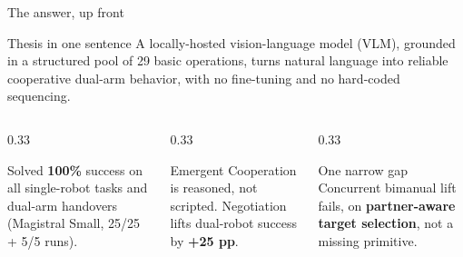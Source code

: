 \documentclass[aspectratio=169,11pt]{beamer}
\begin{document}
\begin{frame}{The answer, up front}
	\begin{block}{Thesis in one sentence}
		A \alert{locally-hosted vision-language model (VLM)}, grounded in a structured pool
		of \alert{29 basic operations}, turns natural language into reliable
		\alert{cooperative dual-arm behavior}, with \alert{no fine-tuning and no
			hard-coded sequencing}.
	\end{block}
	\vfill
	\begin{columns}[t]
		\begin{column}{0.33\textwidth}
			\begin{exampleblock}{Solved}
				\textbf{100\%} success on all single-robot tasks and dual-arm handovers
				(Magistral Small, 25/25 + 5/5 runs).
			\end{exampleblock}
		\end{column}
		\begin{column}{0.33\textwidth}
			\begin{exampleblock}{Emergent}
				Cooperation is reasoned, not scripted. Negotiation lifts dual-robot
				success by \textbf{+25 pp}.
			\end{exampleblock}
		\end{column}
		\begin{column}{0.33\textwidth}
			\begin{alertblock}{One narrow gap}
				Concurrent bimanual lift fails, on \textbf{partner-aware target selection},
				not a missing primitive.
			\end{alertblock}
		\end{column}
	\end{columns}
\end{frame}
\end{document}
